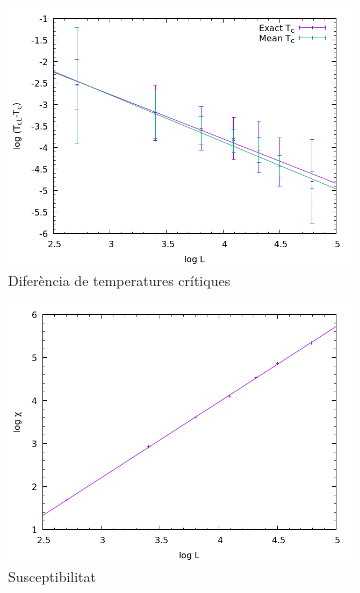 \documentclass[a4paper]{article}
\begin{document}
\begin{figure}[H]
    \centering
    \begin{subfigure}{.45\textwidth}
        \centering
        \includegraphics[width=\textwidth]{coefs-nu.png}
        \caption{Diferència de temperatures crítiques}
        \label{fig:coefs-nu}
    \end{subfigure}
    \begin{subfigure}{.45\textwidth}
        \centering
        \includegraphics[width=\textwidth]{coefs-gammanu.png}
        \caption{Susceptibilitat}
        \label{fig:coefs-gammanu}
    \end{subfigure}
        \begin{subfigure}{.45\textwidth}

\end{subfigure}
\end{figure}
\end{document}
